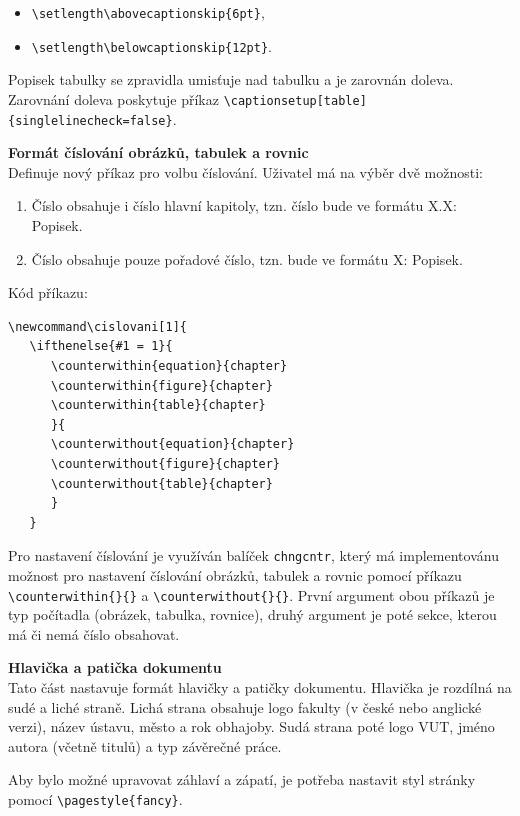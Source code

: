 \begin{itemize}[label=-]
	\item \verb|\setlength\abovecaptionskip{6pt}|,
	\item \verb|\setlength\belowcaptionskip{12pt}|.
\end{itemize}

Popisek tabulky se zpravidla umisťuje nad tabulku a je zarovnán doleva. Zarovnání doleva poskytuje příkaz \verb|\captionsetup[table]{singlelinecheck=false}|.

\vspace{8pt}
\textbf{Formát číslování obrázků, tabulek a rovnic}\\
Definuje nový příkaz pro volbu číslování. Uživatel má na výběr dvě možnosti:

\begin{enumerate}
	\item Číslo obsahuje i číslo hlavní kapitoly, tzn. číslo bude ve formátu X.X: Popisek.
	\item Číslo obsahuje pouze pořadové číslo, tzn. bude ve formátu X: Popisek.
\end{enumerate}

Kód příkazu:

\begin{verbatim}
\newcommand\cislovani[1]{
   \ifthenelse{#1 = 1}{
      \counterwithin{equation}{chapter}
      \counterwithin{figure}{chapter}
      \counterwithin{table}{chapter}
      }{
      \counterwithout{equation}{chapter}
      \counterwithout{figure}{chapter}
      \counterwithout{table}{chapter}
      }
   }
\end{verbatim}

Pro nastavení číslování je využíván balíček \verb|chngcntr|, který má implementovánu možnost pro nastavení číslování obrázků, tabulek a rovnic pomocí příkazu \verb|\counterwithin{}{}| a \verb|\counterwithout{}{}|. První argument obou příkazů je typ počítadla (obrázek, tabulka, rovnice), druhý argument je poté sekce, kterou má či nemá číslo obsahovat. 

\vspace{8pt}
\textbf{Hlavička a patička dokumentu}\\
Tato část nastavuje formát hlavičky a patičky dokumentu. Hlavička je rozdílná na sudé a liché straně. Lichá strana obsahuje logo fakulty (v české nebo anglické verzi), název ústavu, město a rok obhajoby. Sudá strana poté logo VUT, jméno autora (včetně titulů) a typ závěrečné práce.

Aby bylo možné upravovat záhlaví a zápatí, je potřeba nastavit styl stránky pomocí \verb|\pagestyle{fancy}|.

